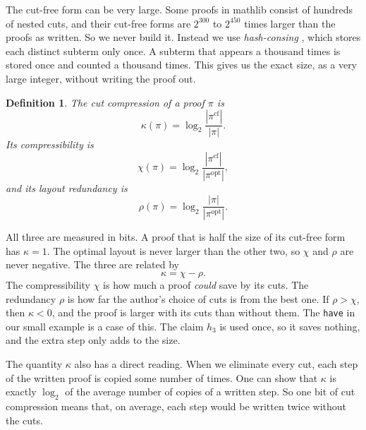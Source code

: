 \documentclass{article}
\newtheorem*{definition}{Definition}
\begin{document}
The cut-free form can be very large. Some proofs in mathlib consist of hundreds of nested cuts, and their cut-free forms
are $2^{300}$ to $2^{450}$ times larger than the proofs as written. So we never build it. Instead we use
\textit{hash-consing} \textit{\parencite{filliatre2006hashcons}}, which stores each distinct subterm only once. A subterm that appears a thousand times is stored
once and counted a thousand times. This gives us the exact size, as a very large integer, without writing the proof
out.

\begin{definition}
The \textit{cut compression} of a proof $\pi$ is
\[
\kappa(\pi)=\log_2\frac{|\pi^{\mathrm{cf}}|}{|\pi|}.
\]
Its \textit{compressibility} is
\[
\chi(\pi)=\log_2\frac{|\pi^{\mathrm{cf}}|}{|\pi^{\mathrm{opt}}|},
\]
and its \textit{layout redundancy} is
\[
\rho(\pi)=\log_2\frac{|\pi|}{|\pi^{\mathrm{opt}}|}.
\]
\end{definition}

All three are measured in bits. A proof that is half the size of its cut-free form has $\kappa=1$. The optimal layout is
never larger than the other two, so $\chi$ and $\rho$ are never negative. The three are related by
\[
\kappa=\chi-\rho.
\]
The compressibility $\chi$ is how much a proof \textit{could} save by its cuts. The redundancy $\rho$ is how far the
author's choice of cuts is from the best one. If $\rho>\chi$, then $\kappa<0$, and the proof is larger with its cuts
than without them. The \texttt{have} in our small example is a case of this. The claim $h_3$ is used once, so it saves
nothing, and the extra step only adds to the size.

The quantity $\kappa$ also has a direct reading. When we eliminate every cut, each step of the written proof is copied some
number of times. One can show that $\kappa$ is exactly $\log_2$ of the average number of copies of a written step. So
one bit of cut compression means that, on average, each step would be written twice without the cuts.
\end{document}
